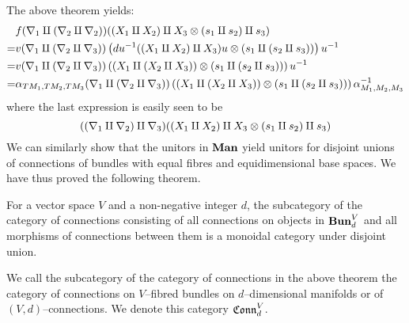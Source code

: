 \documentclass[./Thick_TQFTs_and_Quantum_Information.tex]{subfiles}
\begin{document}
The above theorem yields:
\begin{align*}
  & f(\nabla_1 \amalg (\nabla_2 \amalg \nabla_2))(
      (X_1 \amalg X_2) \amalg X_3
      \otimes (s_1 \amalg s_2) \amalg s_3
      ) \\
  =& v(\nabla_1 \amalg (\nabla_2 \amalg \nabla_3))\left( 
    du^{-1}((X_1 \amalg X_2) \amalg X_3)u
    \otimes (s_1 \amalg (s_2 \amalg s_3))
   \right)u^{-1}\\
  =& v(\nabla_1 \amalg (\nabla_2 \amalg \nabla_3))\left( 
    (X_1 \amalg (X_2 \amalg X_3))
    \otimes (s_1 \amalg (s_2 \amalg s_3))
   \right)u^{-1} \\
  =& \alpha_{TM_1, TM_2, TM_3}(\nabla_1 \amalg (\nabla_2 \amalg \nabla_3))\left( 
    (X_1 \amalg (X_2 \amalg X_3))
    \otimes (s_1 \amalg (s_2 \amalg s_3))
   \right)\alpha_{M_1, M_2, M_3}^{-1}
\end{align*}
where the last expression is easily seen to be
\[
  ((\nabla_1 \amalg \nabla_2) \amalg \nabla_3)(
    (X_1 \amalg X_2) \amalg X_3 \otimes (s_1 \amalg s_2) \amalg s_3
  )
\]
We can similarly show that the unitors in $\textbf{Man}$ yield unitors for disjoint
unions of connections of bundles with equal fibres and equidimensional base
spaces. We have thus proved the following theorem.
\begin{thm}
For a vector space $V$ and a non-negative integer $d$, the subcategory of the
category of connections consisting of all connections on objects in
$\textbf{Bun}_d^{V}$ and all morphisms of connections between them is a monoidal
category under disjoint union.
\end{thm}
\begin{defn}
We call the subcategory of the category of connections in the above theorem the
category of connections on $V$--fibred bundles on $d$--dimensional manifolds or
of $(V, d)$--connections. We denote this category $\mathfrak{Conn}^V_d$.
\end{defn}

\end{document}
